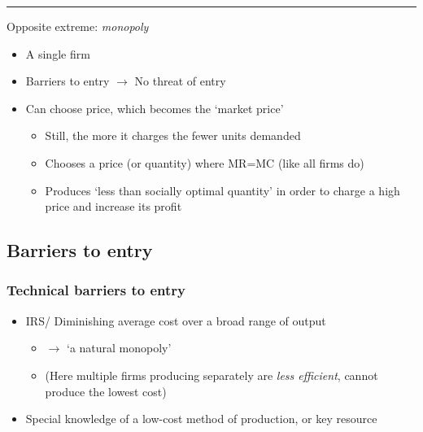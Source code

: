 \documentclass[]{article}
\providecommand{\tightlist}{%
  \setlength{\itemsep}{0pt}\setlength{\parskip}{0pt}}
\begin{document}
\begin{center}\rule{0.5\linewidth}{\linethickness}\end{center}

Opposite extreme: \emph{monopoly}

\begin{itemize}
\item
  A single firm
\item
  Barriers to entry \(\rightarrow\) No threat of entry
\item
  Can choose price, which becomes the `market price'

  \begin{itemize}
  \item
    Still, the more it charges the fewer units demanded
  \item
    Chooses a price (or quantity) where MR=MC (like all firms do)
  \item
    Produces `less than socially optimal quantity' in order to charge a
    high price and increase its profit
  \end{itemize}
\end{itemize}

\hypertarget{barriers-to-entry}{%
\subsection{Barriers to entry}\label{barriers-to-entry}}

\hypertarget{technical-barriers-to-entry}{%
\subsubsection{Technical barriers to
entry}\label{technical-barriers-to-entry}}

\begin{itemize}
\tightlist
\item
  IRS/ Diminishing average cost over a broad range of output

  \begin{itemize}
  \tightlist
  \item
    \(\rightarrow\) `a natural monopoly'
  \item
    (Here multiple firms producing separately are \emph{less efficient},
    cannot produce the lowest cost)
  \end{itemize}
\item
  Special knowledge of a low-cost method of production, or key resource
\end{itemize}
\end{document}
